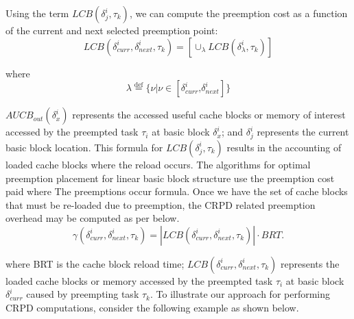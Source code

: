 \noindent
Using the term \begin{math}\textit{LCB}(\delta_{j}^{i},\tau_{k})\end{math}, we can compute the preemption cost as a function of the current and next selected preemption point:
\begin{equation}\label{eqn:lcb-formula-3}
\textit{LCB}(\delta_{curr}^{i},\delta_{next}^{i},\tau_{k}) = [\cup_\lambda \textit{LCB}(\delta_{\lambda}^{i},\tau_{k})]
\end{equation}

\noindent
where
\begin{equation*}\label{eqn:lcb-formula-1b}
    \lambda \stackrel{\text{def}}{=} \{ \nu|\nu \in [ \delta_{curr}^{i} \text{,} \delta_{next}^{i} ] \}
\end{equation*}

\noindent
\begin{math}\textit{AUCB}_{out}(\delta_{x}^{i})\end{math} represents the accessed useful cache blocks or memory of interest accessed by the preempted task \begin{math}\tau_{i}\end{math} at basic block \begin{math}\delta_{x}^{i}\end{math}; and \begin{math}\delta_{j}^{i}\end{math} represents the current basic block location.  This formula for \begin{math}\textit{LCB}(\delta_{j}^{i},\tau_{k})\end{math} results in the accounting of loaded cache blocks where the reload occurs.  The algorithms for optimal preemption placement for linear basic block structure use the preemption cost paid where The preemptions occur formula.  Once we have the set of cache blocks that must be re-loaded due to preemption, the CRPD related preemption overhead may be computed as per below.
\begin{equation}\label{eqn:crpd-formula}
    \gamma(\delta_{curr}^{i},\delta_{next}^{i},\tau_{k}) = | \textit{LCB}(\delta_{curr}^{i},\delta_{next}^{i},\tau_{k}) | \cdot BRT.
\end{equation}

\noindent where BRT is the cache block reload time; \begin{math}\textit{LCB}(\delta_{curr}^{i},\delta_{next}^{i},\tau_{k})\end{math} represents the loaded cache blocks or memory accessed by the preempted task \begin{math}\tau_{i}\end{math} at basic block \begin{math}\delta_{curr}^{i}\end{math} caused by preempting task \begin{math}\tau_{k}\end{math}.
\newline
\newline
\noindent
To illustrate our approach for performing CRPD computations, consider the following example as shown below.


